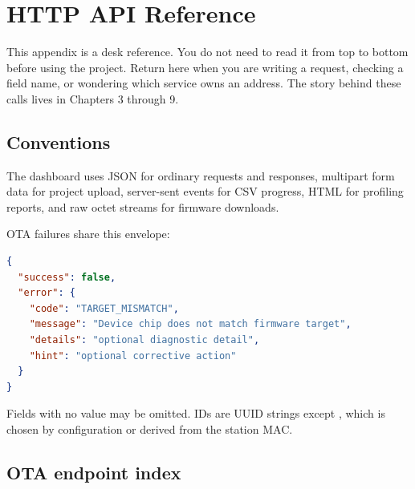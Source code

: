 \chapter{HTTP API Reference}

This appendix is a desk reference. You do not need to read it from top to bottom before using the project. Return here when you are writing a request, checking a field name, or wondering which service owns an address. The story behind these calls lives in Chapters 3 through 9.

\section{Conventions}

The dashboard uses JSON for ordinary requests and responses, multipart form data for project upload, server-sent events for CSV progress, HTML for profiling reports, and raw octet streams for firmware downloads.

OTA failures share this envelope:

\begin{lstlisting}[language=JSON,numbers=none]
{
  "success": false,
  "error": {
    "code": "TARGET_MISMATCH",
    "message": "Device chip does not match firmware target",
    "details": "optional diagnostic detail",
    "hint": "optional corrective action"
  }
}
\end{lstlisting}

Fields with no value may be omitted. IDs are UUID strings except , which is chosen by configuration or derived from the station MAC.

\section{OTA endpoint index}

